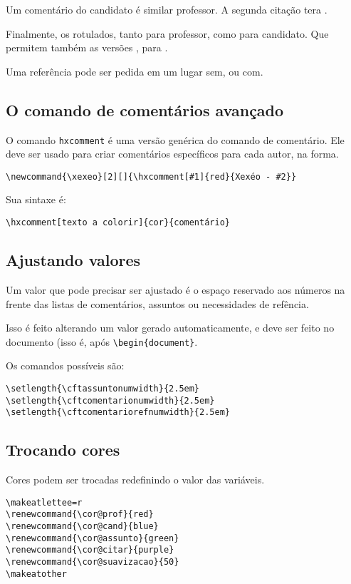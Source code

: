 \documentclass{article}
\begin{document}
Um comentário do candidato é similar professor. A segunda citação tera .

Finalmente, os rotulados, tanto para professor, como para candidato. Que permitem também as versões , para .

Uma referência pode ser pedida em um lugar sem\favorcitar, ou com\favorcitar[o experimento].

\subsection{O comando de comentários avançado}

O comando \verb!hxcomment! é uma versão genérica do comando de comentário. Ele deve ser usado para criar comentários específicos para cada autor, na forma.

\begin{verbatim}
\newcommand{\xexeo}[2][]{\hxcomment[#1]{red}{Xexéo - #2}}
\end{verbatim}

Sua sintaxe é:
\begin{verbatim}
\hxcomment[texto a colorir]{cor}{comentário}
\end{verbatim}

\subsection{Ajustando valores}

Um valor que pode precisar ser ajustado é o espaço reservado aos números na frente das listas de comentários, assuntos ou necessidades de refência.

Isso é feito alterando um valor gerado automaticamente, e deve ser feito no documento (isso é, após \verb!\begin{document}!.

Os comandos possíveis são:
\begin{verbatim}
\setlength{\cftassuntonumwidth}{2.5em}
\setlength{\cftcomentarionumwidth}{2.5em}
\setlength{\cftcomentariorefnumwidth}{2.5em}
\end{verbatim}

\subsection{Trocando cores}
Cores podem ser trocadas redefinindo o valor das variáveis.
\begin{verbatim}
\makeatlettee=r
\renewcommand{\cor@prof}{red}
\renewcommand{\cor@cand}{blue}
\renewcommand{\cor@assunto}{green}
\renewcommand{\cor@citar}{purple}
\renewcommand{\cor@suavizacao}{50}
\makeatother
\end{verbatim}
\end{document}
